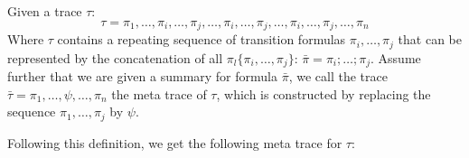 \begin{mydef}
	Given a trace $\tau$:
	\begin{equation*}
		\tau = \pi_1, \ldots, \pi_i, \ldots, \pi_j, \ldots, \pi_i, \ldots, \pi_j, \ldots, \pi_i, \ldots, \pi_j, \ldots, \pi_n
	\end{equation*}
	Where $\tau$ contains a repeating sequence of transition formulas $\pi_i, \ldots, \pi_j$ that can be represented by the concatenation of all $\pi_l \{\pi_i, \ldots, \pi_j\}$: $\bar{\pi} = \pi_i; \ldots; \pi_j$. Assume further that we are given a \qvasr summary for formula $\bar{\pi}$, we call the trace  $\bar{\tau} = \pi_1, \ldots, \psi, \ldots, \pi_n$ the meta trace of $\tau$, which is constructed by replacing the sequence $\pi_1, \ldots, \pi_j$ by $\psi$.
\end{mydef}
\begin{comment}
	\begin{equation*}
	\bar{\tau} = \pi_1, \ldots, \psi, \ldots, \pi_n
	\end{equation*}
	The meta trace $\bar{\tau}$ now contains every trace that begins with $\pi, \ldots, \pi_{i-1}$ and ends with $\pi_{j+1}$ going through the looping sequence $\pi_i, \ldots, \pi_j$. \par
\end{comment}
Following this definition, we get the following meta trace for $\tau$:


